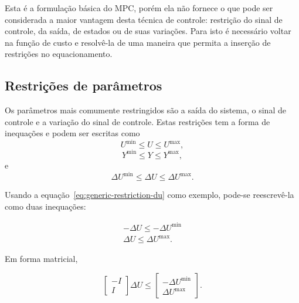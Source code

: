 Esta é a formulação básica do MPC, porém ela não fornece o que pode ser
considerada a maior vantagem desta técnica de controle: restrição do sinal de
controle, da saída, de estados ou de suas variações. Para isto é necessário
voltar na função de custo e resolvê-la de uma maneira que permita a inserção
de restrições no equacionamento.

\subsection{Restrições de parâmetros}%
\label{subsec:mpc-restricted}

Os parâmetros mais comumente restringidos são a saída do sistema, o sinal de
controle e a variação do sinal de controle. Estas restrições tem a forma de
inequações e podem ser escritas como
%
\begin{equation}
	\label{eq:generic-restriction-u}
	U^{\min} \le U \le U^{\max},
\end{equation}
%
\begin{equation}
	\label{eq:generic-restriction-y}
	Y^{\min} \le Y \le Y^{\max},
\end{equation}
%
e
%
\begin{equation}
	\label{eq:generic-restriction-du}
	\Delta{}U^{\min} \le \Delta{}U \le \Delta{}U^{\max}.
\end{equation}

Usando a equação~\eqref{eq:generic-restriction-du} como exemplo, pode-se
reescrevê-la como duas inequações:

\begin{equation}
	\label{eq:generic-restriction-du-two-eq}
	\begin{split}
		-\Delta{}U \le -\Delta{}U^{\min} \\
		\Delta{}U \le \Delta{}U^{\max}.
	\end{split}
\end{equation}

Em forma matricial,

\begin{equation}
	\label{eq:generic-restriction-du-matrix-form}
	\begin{bmatrix}
		-I \\
		I
	\end{bmatrix} \Delta{}U \le
	\begin{bmatrix}
		-\Delta{}U^{\min} \\
		\Delta{}U^{\max}
	\end{bmatrix}.
\end{equation}

